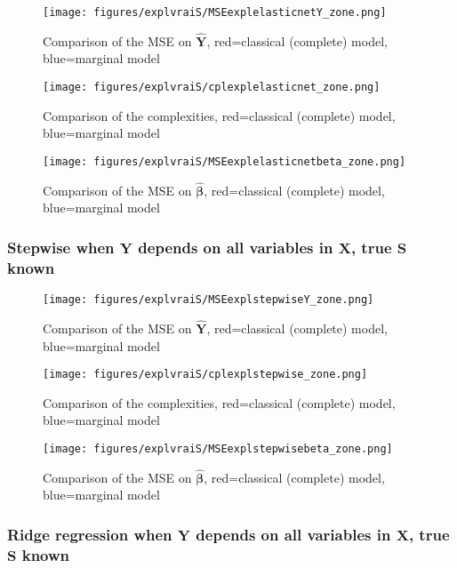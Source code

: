 \documentclass[12pt,a4paper]{report}
\begin{document}
	\begin{figure}[h!]
	\centering
		  \texttt{[image: figures/explvraiS/MSEexplelasticnetY\_zone.png]}
		\caption{Comparison of the MSE on $\hat{\boldsymbol{Y}}$, red=classical (complete) model, blue=marginal model}\label{MSEexplelasticnetY_zone}
	\end{figure}
	\begin{figure}[h!]
	\centering
		  \texttt{[image: figures/explvraiS/cplexplelasticnet\_zone.png]}
		\caption{Comparison of the complexities, red=classical (complete) model, blue=marginal model}\label{cplexplelasticnet_zone}
	\end{figure}
	\begin{figure}[h!]
	\centering
		  \texttt{[image: figures/explvraiS/MSEexplelasticnetbeta\_zone.png]}
		\caption{Comparison of the MSE on $\hat{\boldsymbol{\beta}}$, red=classical (complete) model, blue=marginal model}\label{MSEexplelasticnetbeta_zone}
	\end{figure}
	\FloatBarrier
\newpage
\subsubsection{Stepwise when $\boldsymbol{Y}$ depends on all variables in $\boldsymbol{X}$, true $\boldsymbol{S}$ known}

	\begin{figure}[h!]
	\centering
		  \texttt{[image: figures/explvraiS/MSEexplstepwiseY\_zone.png]}
		\caption{Comparison of the MSE on $\hat{\boldsymbol{Y}}$, red=classical (complete) model, blue=marginal model}\label{MSEexplstepwiseY_zone}
	\end{figure}
	\begin{figure}[h!]
	\centering
		  \texttt{[image: figures/explvraiS/cplexplstepwise\_zone.png]}
		\caption{Comparison of the complexities, red=classical (complete) model, blue=marginal model}\label{cplexplstepwise_zone}
	\end{figure}
	\begin{figure}[h!]
	\centering
		  \texttt{[image: figures/explvraiS/MSEexplstepwisebeta\_zone.png]}
		\caption{Comparison of the MSE on $\hat{\boldsymbol{\beta}}$, red=classical (complete) model, blue=marginal model}\label{MSEexplstepwisebeta_zone}
	\end{figure}
	\FloatBarrier
\newpage
\subsubsection{Ridge regression when $\boldsymbol{Y}$ depends on all variables in $\boldsymbol{X}$, true $\boldsymbol{S}$ known}
\end{document}
